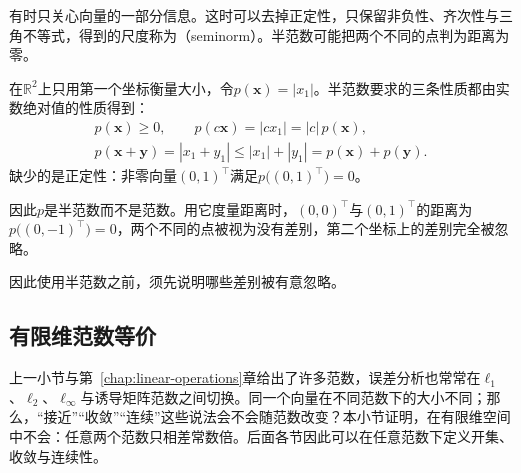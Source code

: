 有时只关心向量的一部分信息。这时可以去掉正定性，只保留非负性、齐次性与三角不等式，得到的尺度称为（seminorm）。半范数可能把两个不同的点判为距离为零。
\begin{example}[只看第一个坐标的半范数]
\label{ex:ls-seminorm-first-coordinate}
在$\mathbb R^2$上只用第一个坐标衡量大小，令$p(\bm x)=|x_1|$。半范数要求的三条性质都由实数绝对值的性质得到：
\[
 \begin{gathered}
 p(\bm x)\geq0,\qquad p(c\bm x)=|cx_1|=|c|\,p(\bm x),\\
 p(\bm x+\bm y)=|x_1+y_1|\leq|x_1|+|y_1|=p(\bm x)+p(\bm y).
 \end{gathered}
\]
缺少的是正定性：非零向量$(0,1)^\top$满足$p\bigl((0,1)^\top\bigr)=0$。

因此$p$是半范数而不是范数。用它度量距离时，$(0,0)^\top$与$(0,1)^\top$的距离为$p\bigl((0,-1)^\top\bigr)=0$，两个不同的点被视为没有差别，第二个坐标上的差别完全被忽略。
\end{example}
因此使用半范数之前，须先说明哪些差别被有意忽略。

\subsection{有限维范数等价}
\label{sec:multivariable-norm-equivalence}
\label{sec:linear-algebra-sequence-convergence}
\label{sec:ls-finite-dimensional-normed-properties}

上一小节与第~\ref{chap:linear-operations}章给出了许多范数，误差分析也常常在$\ell_1$、$\ell_2$、$\ell_\infty$与诱导矩阵范数之间切换。同一个向量在不同范数下的大小不同；那么，“接近”“收敛”“连续”这些说法会不会随范数改变？本小节证明，在有限维空间中不会：任意两个范数只相差常数倍。后面各节因此可以在任意范数下定义开集、收敛与连续性。

